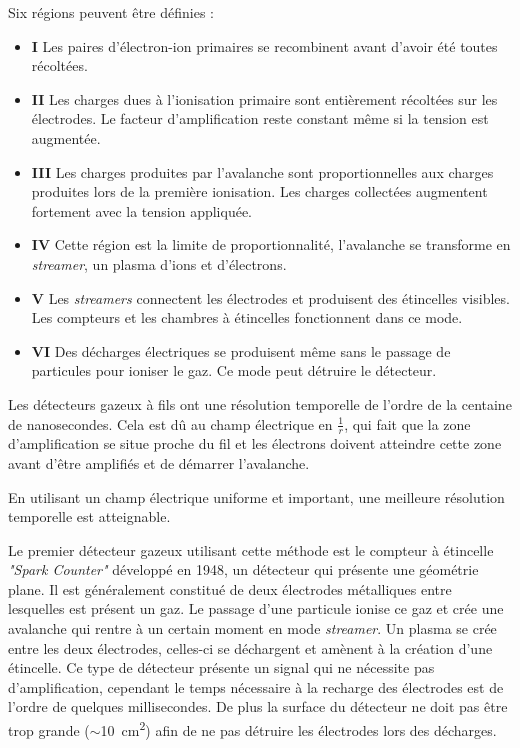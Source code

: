 Six régions peuvent être définies :

\begin{itemize}
	\item \textbf{I} Les paires d'électron-ion primaires se recombinent avant d'avoir été toutes récoltées.
	\item \textbf{II} Les charges dues à l'ionisation primaire sont entièrement récoltées sur les électrodes. Le facteur d'amplification reste constant même si la tension est augmentée.
	\item \textbf{III} Les charges produites par l'avalanche sont proportionnelles aux charges produites lors de la première ionisation. Les charges collectées augmentent fortement avec la tension appliquée.
	\item \textbf{IV} Cette région est la limite de proportionnalité, l'avalanche se transforme en \textit{streamer}, un plasma d'ions et d'électrons.
	\item \textbf{V} Les \textit{streamers} connectent les électrodes et produisent des étincelles visibles. Les compteurs  et les chambres à étincelles fonctionnent dans ce mode.
	\item \textbf{VI} Des décharges électriques se produisent même sans le passage de particules pour ioniser le gaz. Ce mode peut détruire le détecteur.
\end{itemize}
\newpage
Les détecteurs gazeux à fils ont une résolution temporelle de l'ordre de la centaine de nanosecondes. Cela est dû au champ électrique en $\frac{1}{r}$, qui fait que la zone d'amplification se situe proche du fil et les électrons doivent atteindre cette zone avant d'être amplifiés et de démarrer l'avalanche.

En utilisant un champ électrique uniforme et important, une meilleure résolution temporelle est atteignable.

Le premier détecteur gazeux utilisant cette méthode est le compteur à étincelle \textit{"Spark Counter"} développé en \num{1948}, un détecteur qui présente une géométrie plane. Il est généralement constitué de deux électrodes métalliques entre lesquelles est présent un gaz. Le passage d'une particule ionise ce gaz et crée une avalanche qui rentre à un certain moment en mode \textit{streamer}. Un plasma se crée entre les deux électrodes, celles-ci se déchargent et amènent à la création d'une étincelle. Ce type de détecteur présente un signal qui ne nécessite pas d'amplification, cependant le temps nécessaire à la recharge des électrodes est de l'ordre de quelques millisecondes. De plus la surface du détecteur ne doit pas être trop grande ($\sim$\SI{10}{\square\centi\meter}) afin de ne pas détruire les électrodes lors des décharges.


